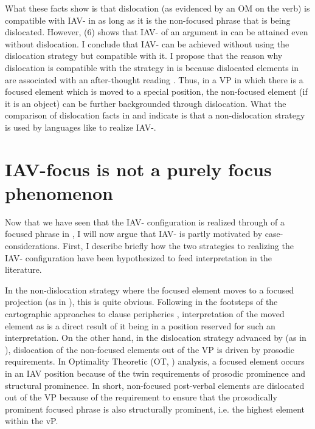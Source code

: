 \documentclass[output=paper,newtxmath,modfonts,nonflat,draft]{langsci/langscibook}
\begin{document}
What these facts show is that dislocation (as evidenced by an OM on the verb) is compatible with IAV- in  as long as it is the non-focused phrase that is being dislocated. However, (6) shows that IAV- of an argument in  can be attained even without dislocation. I conclude that  IAV- can be achieved without using the dislocation strategy but compatible with it. I propose that the reason why dislocation is compatible with the  strategy in  is because dislocated elements in  are associated with an after-thought reading \citep{Diercks2013}. Thus, in a VP in which there is a focused element which is moved to a special position, the non-focused element (if it is an object) can be further backgrounded through dislocation. What the comparison of dislocation facts in  and  indicate is that a non-dislocation strategy is used by languages like  to realize IAV-.

\section{IAV-focus is not a purely focus phenomenon}

Now that we have seen that the IAV- configuration is realized through  of a focused phrase in , I will now argue that  IAV- is partly motivated by case-considerations. First, I describe briefly how the two strategies to realizing the IAV- configuration have been hypothesized to feed  interpretation in the literature.

In the non-dislocation strategy where the focused element moves to a focused projection (as in ), this is quite obvious. Following in the footsteps of the cartographic approaches to clause peripheries \citep{rizzi1997}, interpretation of the moved element as  is a direct result of it being in a position reserved for such an interpretation. On the other hand, in the dislocation strategy advanced by \citet{chengdowning2012} (as in ), dislocation of the non-focused elements out of the VP is driven by prosodic requirements. In  Optimality Theoretic (OT, \citealt{Prince1993}) analysis, a focused element occurs in an IAV position because of the twin requirements of prosodic prominence and structural prominence. In short, non-focused post-verbal elements are dislocated out of the VP because of the requirement to ensure that the prosodically prominent focused phrase is also structurally prominent, i.e. the highest element within the vP. 
\end{document}
